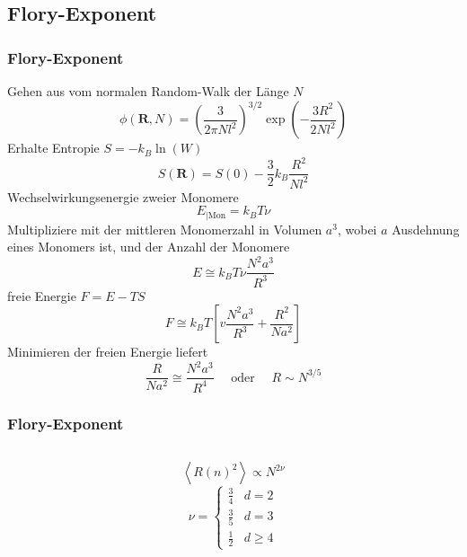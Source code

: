 \documentclass{beamer}
\begin{document}
\subsection{Flory-Exponent}
{ %
\begin{frame}
	\frametitle{Flory-Exponent}
	\tiny
	Gehen aus vom normalen Random-Walk der Länge $N$
	\begin{equation*}
		\phi(\mathbf{R}, N)=\left(\frac{3}{2 \pi Nl^2}\right)^{3 / 2} \exp \left(-\frac{3 R^{2}}{2 Nl^2}\right)
	\end{equation*}
	Erhalte Entropie $S=-k_B \ln(W)$
	\begin{equation*}
		S(\mathbf{R})=S(0)-\frac{3}{2} k_{B} \frac{R^{2}}{N l^{2}}
	\end{equation*}
	Wechselwirkungsenergie zweier Monomere
	\begin{equation*}
		E_{\mid \mathrm{Mon}}=k_{B} T \nu
	\end{equation*}
	Multipliziere mit der mittleren Monomerzahl in Volumen $a^3$, wobei $a$ Ausdehnung eines Monomers ist, und der Anzahl der Monomere
	\begin{equation*}
		E \cong k_{B} T \nu \frac{N^{2} a^{3}}{R^{3}}
	\end{equation*}
	freie Energie $F=E-TS$
	\begin{equation*}
		F \cong k_{B} T\left[v \frac{N^{2} a^{3}}{R^{3}}+\frac{R^{2}}{N a^{2}}\right]
	\end{equation*}
	Minimieren der freien Energie liefert
	\begin{equation*}
		\frac{R}{N a^{2}} \cong \frac{N^{2} a^{3}}{R^{4}} \quad \text { oder } \quad \boxed{R \sim N^{3 / 5}}
	\end{equation*}
\end{frame}
\begin{frame}
	\frametitle{Flory-Exponent}
	\begin{columns}[t]
		\begin{column}{0.5\textwidth}
			\begin{equation*}
				\left<R(n)^2\right> \propto N^{2\nu}
			\end{equation*}
			\begin{equation*}
				\nu = \begin{cases}
					\frac{3}{4} & d=2 \\
					\frac{3}{5} & d=3 \\
					\frac{1}{2} & d \geq 4

\end{cases}
\end{equation*}
\end{column}
\end{columns}
\end{frame}}
\end{document}
